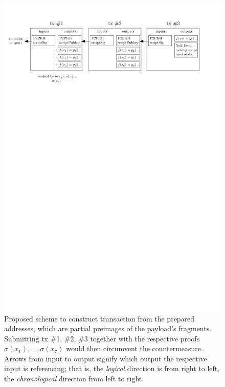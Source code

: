 \documentclass[a4paper,11pt,titlepage]{scrbook}
\begin{document}
\begin{figure}
    \centering
    \includegraphics[width=14cm,keepaspectratio]{figure.pdf}
    \caption[Proposed scheme to construct transaction from the prepared addresses to circumvent the countermeasure]{Proposed scheme to construct transaction from the prepared addresses, which are partial preimages of the payload's fragments. Submitting tx \#1, \#2, \#3 together with the respective proofs $\sigma(x_1), \dots, \sigma(x_7)$ would then circumvent the countermeasure. Arrows from input to output signify which output the respective input is referencing; that is, the \emph{logical} direction is from right to left, the \emph{chronological} direction from left to right.}
    \label{fig:tx-construction}
\end{figure}
\end{document}
